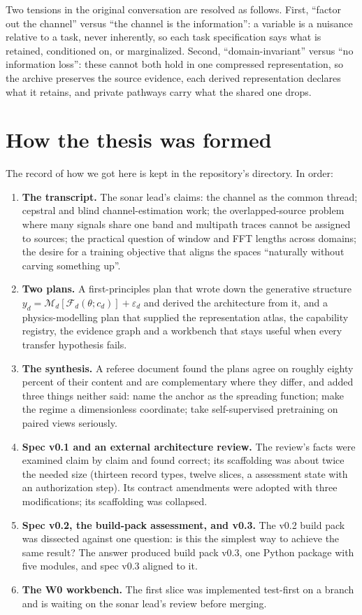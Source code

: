 \documentclass[11pt,a4paper]{article}
\begin{document}
Two tensions in the original conversation are resolved as follows. First, ``factor out the channel'' versus ``the channel is the information'': a variable is a nuisance relative to a task, never inherently, so each task specification says what is retained, conditioned on, or marginalized. Second, ``domain-invariant'' versus ``no information loss'': these cannot both hold in one compressed representation, so the archive preserves the source evidence, each derived representation declares what it retains, and private pathways carry what the shared one drops.

\section{How the thesis was formed}
\label{sec:provenance}

The record of how we got here is kept in the repository's  directory. In order:
\begin{enumerate}
\item \textbf{The transcript.} The sonar lead's claims: the channel as the common thread; cepstral and blind channel-estimation work; the overlapped-source problem where many signals share one band and multipath traces cannot be assigned to sources; the practical question of window and FFT lengths across domains; the desire for a training objective that aligns the spaces ``naturally without carving something up''.
\item \textbf{Two plans.} A first-principles plan that wrote down the generative structure $y_d=\mathcal M_d[\mathcal F_d(\theta;c_d)]+\varepsilon_d$ and derived the architecture from it, and a physics-modelling plan that supplied the representation atlas, the capability registry, the evidence graph and a workbench that stays useful when every transfer hypothesis fails.
\item \textbf{The synthesis.} A referee document found the plans agree on roughly eighty percent of their content and are complementary where they differ, and added three things neither said: name the anchor as the spreading function; make the regime a dimensionless coordinate; take self-supervised pretraining on paired views seriously.
\item \textbf{Spec v0.1 and an external architecture review.} The review's facts were examined claim by claim and found correct; its scaffolding was about twice the needed size (thirteen record types, twelve slices, a  assessment state with an authorization step). Its contract amendments were adopted with three modifications; its scaffolding was collapsed.
\item \textbf{Spec v0.2, the build-pack assessment, and v0.3.} The v0.2 build pack was dissected against one question: is this the simplest way to achieve the same result? The answer produced build pack v0.3, one Python package with five modules, and spec v0.3 aligned to it.
\item \textbf{The W0 workbench.} The first slice was implemented test-first on a branch and is waiting on the sonar lead's review before merging.
\end{enumerate}
\end{document}
